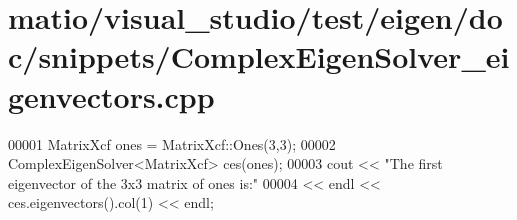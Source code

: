 \hypertarget{matio_2visual__studio_2test_2eigen_2doc_2snippets_2_complex_eigen_solver__eigenvectors_8cpp_source}{}\section{matio/visual\+\_\+studio/test/eigen/doc/snippets/\+Complex\+Eigen\+Solver\+\_\+eigenvectors.cpp}
\label{matio_2visual__studio_2test_2eigen_2doc_2snippets_2_complex_eigen_solver__eigenvectors_8cpp_source}

\begin{DoxyCode}
00001 MatrixXcf ones = MatrixXcf::Ones(3,3);
00002 ComplexEigenSolver<MatrixXcf> ces(ones);
00003 cout << \textcolor{stringliteral}{"The first eigenvector of the 3x3 matrix of ones is:"} 
00004      << endl << ces.eigenvectors().col(1) << endl;
\end{DoxyCode}
